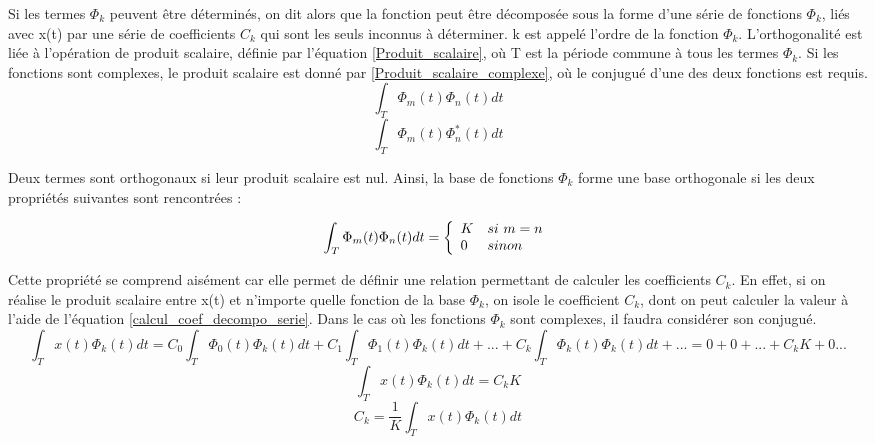 	
	Si les termes $\Phi_{k}$ peuvent être déterminés, on dit alors que la fonction peut être décomposée sous la forme d'une série de fonctions $\Phi_{k}$, liés avec x(t) par une série de coefficients $C_{k}$ qui sont les seuls inconnus à déterminer. k est appelé l'ordre de la fonction $\Phi_{k}$. L'orthogonalité est liée à l'opération de produit scalaire, définie par l'équation \ref{Produit_scalaire}, où T est la période commune à tous les termes $\Phi_{k}$. Si les fonctions sont complexes, le produit scalaire est donné par \ref{Produit_scalaire_complexe}, où le conjugué d'une des deux fonctions est requis.
	\begin{equation}\label{Produit_scalaire}
	\int_{T}\Phi_{m}(t)\Phi_{n}(t)dt
	\end{equation}
	\begin{equation}\label{Produit_scalaire_complexe}
	\int_{T}\Phi_{m}(t)\Phi_{n}^{*}(t)dt
	\end{equation}
	
	 Deux termes sont orthogonaux si leur produit scalaire est nul. Ainsi, la base de fonctions $\Phi_{k}$ forme une base orthogonale si les deux propriétés suivantes sont rencontrées :
	
	\begin{equation}\label{Def_base_fonctions_orthogonales}
	\int_{T}\Phi_{m}(t)\Phi_{n}(t)dt=\left \{
	\begin{array}{l l}
	K   & si~m=n \\
	0   & sinon \\
	\end{array}
	\right .
	\end{equation}
	
	Cette propriété se comprend aisément car elle permet de définir une relation permettant de calculer les coefficients $C_{k}$. En effet, si on réalise le produit scalaire entre x(t) et n'importe quelle fonction de la base $\Phi_{k}$, on isole le coefficient $C_{k}$, dont on peut calculer la valeur à l'aide de l'équation \ref{calcul_coef_decompo_serie}. Dans le cas où les fonctions $\Phi_{k}$ sont complexes, il faudra considérer son conjugué.
	\begin{equation*}
	\int_{T}x(t)\Phi_{k}(t)dt=C_{0}\int_{T}\Phi_{0}(t)\Phi_{k}(t)dt+C_{1}\int_{T}\Phi_{1}(t)\Phi_{k}(t)dt+...+C_{k}\int_{T}\Phi_{k}(t)\Phi_{k}(t)dt+...=0+0+...+C_{k}K+0...
	\end{equation*}
	\begin{equation*}
	\int_{T}x(t)\Phi_{k}(t)dt=C_{k}K
	\end{equation*}
	\begin{equation}\label{calcul_coef_decompo_serie}
	C_{k}=\frac{1}{K}\int_{T}x(t)\Phi_{k}(t)dt
	\end{equation}
	

